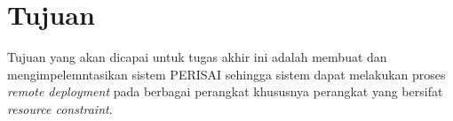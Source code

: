 \section{Tujuan}

Tujuan yang akan dicapai untuk tugas akhir ini adalah membuat dan mengimpelemntasikan sistem PERISAI sehingga sistem dapat melakukan proses \textit{remote deployment} pada berbagai perangkat khususnya perangkat yang bersifat \textit{resource constraint}.